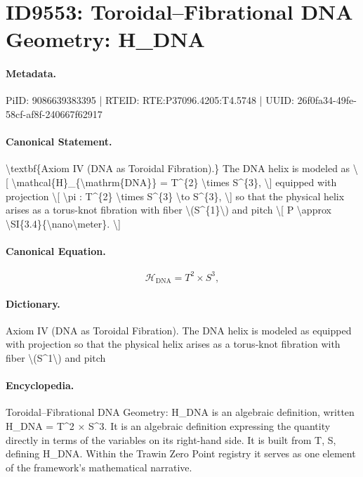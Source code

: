 \section*{ID9553: Toroidal–Fibrational DNA Geometry: H\_DNA}
\paragraph{Metadata.}
PiID: 9086639383395 | RTEID: RTE:P37096.4205:T4.5748 | UUID: 26f0fa34-49fe-58cf-af8f-240667f62917

\paragraph{Canonical Statement.}
\textbackslash{}textbf\{Axiom IV (DNA as Toroidal Fibration).\} The DNA helix is modeled as \textbackslash{}[ \textbackslash{}mathcal\{H\}\_\{\textbackslash{}mathrm\{DNA\}\} = T\textasciicircum{}\{2\} \textbackslash{}times S\textasciicircum{}\{3\}, \textbackslash{}] equipped with projection \textbackslash{}[ \textbackslash{}pi : T\textasciicircum{}\{2\} \textbackslash{}times S\textasciicircum{}\{3\} \textbackslash{}to S\textasciicircum{}\{3\}, \textbackslash{}] so that the physical helix arises as a torus-knot fibration with fiber \textbackslash{}(S\textasciicircum{}\{1\}\textbackslash{}) and pitch \textbackslash{}[ P \textbackslash{}approx \textbackslash{}SI\{3.4\}\{\textbackslash{}nano\textbackslash{}meter\}. \textbackslash{}]

\paragraph{Canonical Equation.}
\[
\mathcal{H}_{\mathrm{DNA}} = T^{2} \times S^{3},
\]

\paragraph{Dictionary.}
Axiom IV (DNA as Toroidal Fibration). The DNA helix is modeled as equipped with projection so that the physical helix arises as a torus-knot fibration with fiber \textbackslash{}(S\textasciicircum{}1\textbackslash{}) and pitch

\paragraph{Encyclopedia.}
Toroidal–Fibrational DNA Geometry: H\_DNA is an algebraic definition, written H\_DNA = T\textasciicircum{}2 × S\textasciicircum{}3. It is an algebraic definition expressing the quantity directly in terms of the variables on its right-hand side. It is built from T, S, defining H\_DNA. Within the Trawin Zero Point registry it serves as one element of the framework's mathematical narrative.

